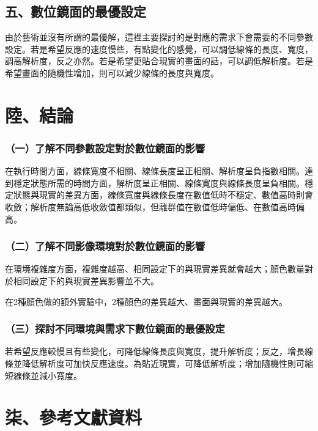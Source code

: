\documentclass[12pt]{article}
\begin{document}
\subsection{五、數位鏡面的最優設定}

由於藝術並沒有所謂的最優解，這裡主要探討的是對應的需求下會需要的不同參數設定。若是希望反應的速度慢些，有點變化的感覺，可以調低線條的長度、寬度，調高解析度，反之亦然。若是希望更貼合現實的畫面的話，可以調低解析度。若是希望畫面的隨機性增加，則可以減少線條的長度與寬度。

\newpage
\section{陸、結論}

\subsubsection{（一）了解不同參數設定對於數位鏡面的影響}

在執行時間方面，線條寬度不相關、線條長度呈正相關、解析度呈負指數相關。達到穩定狀態所需的時間方面，解析度呈正相關、線條寬度與線條長度呈負相關。穩定狀態與現實的差異方面，線條寬度與線條長度在數值低時不穩定、數值高時則會收斂；解析度無論高低收斂值都類似，但離群值在數值低時偏低、在數值高時偏高。

\subsubsection{（二）了解不同影像環境對於數位鏡面的影響}

在環境複雜度方面，複雜度越高、相同設定下的與現實差異就會越大；顏色數量對於相同設定下的與現實差異影響並不大。

在2種顏色做的額外實驗中，2種顏色的差異越大、畫面與現實的差異越大。

\subsubsection{（三）探討不同環境與需求下數位鏡面的最優設定}

若希望反應較慢且有些變化，可降低線條長度與寬度，提升解析度；反之，增長線條並降低解析度可加快反應速度。為貼近現實，可降低解析度；增加隨機性則可縮短線條並減小寬度。

\newpage
\section{柒、參考文獻資料}


\end{document}
